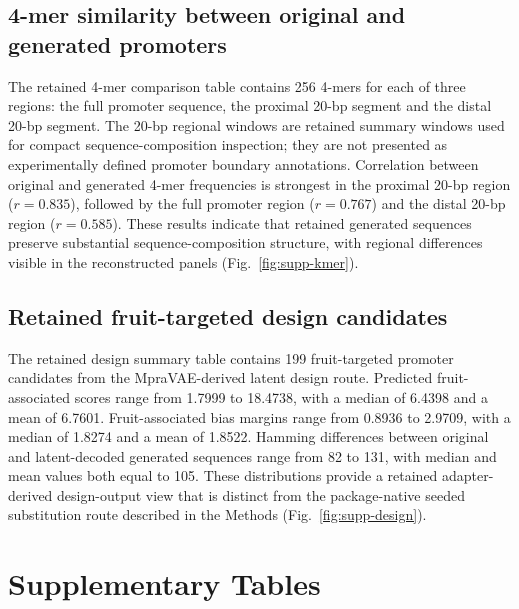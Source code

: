 \documentclass[10pt]{article}
\begin{document}
\subsection{4-mer similarity between original and generated promoters}

The retained 4-mer comparison table contains 256 4-mers for each of three regions: the full promoter sequence, the proximal 20-bp segment and the distal 20-bp segment. The 20-bp regional windows are retained summary windows used for compact sequence-composition inspection; they are not presented as experimentally defined promoter boundary annotations. Correlation between original and generated 4-mer frequencies is strongest in the proximal 20-bp region (\(r = 0.835\)), followed by the full promoter region (\(r = 0.767\)) and the distal 20-bp region (\(r = 0.585\)). These results indicate that retained generated sequences preserve substantial sequence-composition structure, with regional differences visible in the reconstructed panels (Fig.~\ref{fig:supp-kmer}).

\subsection{Retained fruit-targeted design candidates}

The retained design summary table contains 199 fruit-targeted promoter candidates from the MpraVAE-derived latent design route. Predicted fruit-associated scores range from 1.7999 to 18.4738, with a median of 6.4398 and a mean of 6.7601. Fruit-associated bias margins range from 0.8936 to 2.9709, with a median of 1.8274 and a mean of 1.8522. Hamming differences between original and latent-decoded generated sequences range from 82 to 131, with median and mean values both equal to 105. These distributions provide a retained adapter-derived design-output view that is distinct from the package-native seeded substitution route described in the Methods (Fig.~\ref{fig:supp-design}).

\section{Supplementary Tables}
\end{document}

